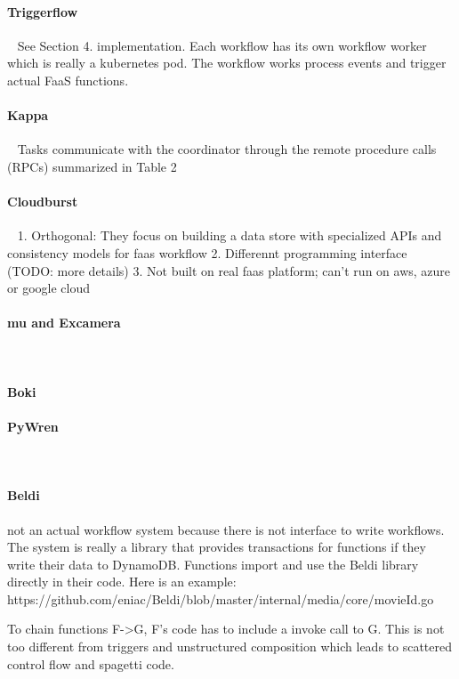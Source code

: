 \paragraph{Triggerflow}~\cite{triggerflow}
See Section 4. implementation. Each workflow has its own workflow worker which is really a kubernetes pod. The workflow works process events and trigger actual FaaS functions.


\paragraph{Kappa}~\cite{kappa}
Tasks communicate with the coordinator through
the remote procedure calls (RPCs) summarized in Table 2


\paragraph{Cloudburst}~\cite{cloudburst}
1. Orthogonal: They focus on building a data store with specialized APIs and consistency models for faas workflow
2. Differennt programming interface (TODO: more details)
3. Not built on real faas platform; can't run on aws, azure or google cloud


\paragraph{mu and Excamera}~\cite{excamera}

\paragraph{Boki}


\paragraph{PyWren}~\cite{pywren}

\paragraph{Beldi}

not an actual workflow system because there is not interface to write
workflows. The system is really a library that provides transactions for
functions if they write their data to DynamoDB. Functions import and use the
Beldi library directly in their code. Here is an example:
https://github.com/eniac/Beldi/blob/master/internal/media/core/movieId.go

To chain functions F->G, F's code has to include a invoke call to G. This is
not too different from triggers and unstructured composition which leads to
scattered control flow and spagetti code.

